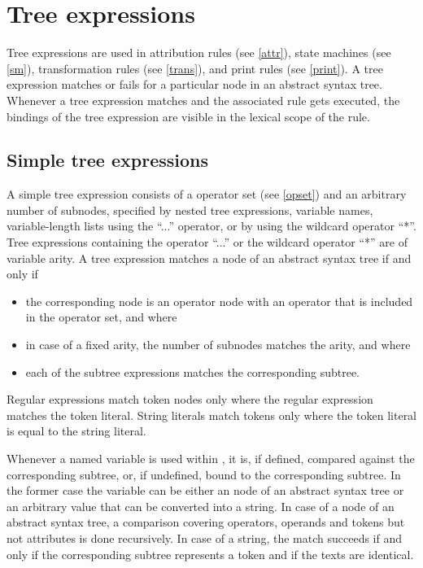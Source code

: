 \chapter{Tree expressions}\label{treeexpr}

Tree expressions are used in attribution rules (see \ref{attr}), state
machines (see \ref{sm}), transformation rules (see \ref{trans}), and
print rules (see \ref{print}). A tree expression matches or fails for a
particular node in an abstract syntax tree. Whenever a tree expression
matches and the associated rule gets executed, the bindings of the tree
expression are visible in the lexical scope of the rule.

\section{Simple tree expressions}

A simple tree expression consists of a operator set (see \ref{opset}) and an arbitrary number of subnodes, specified
by nested tree expressions, variable names, variable-length lists
using the ``...'' operator, or by using the wildcard operator
``*''. Tree expressions containing the operator ``...'' or the wildcard
operator ``*'' are of variable arity.  A tree
expression matches a node of an abstract syntax tree if and only if
\begin{itemize}
   \item the corresponding node is an operator node
      with an operator that is included in the operator set, and where
   \item in case of a fixed arity, the number of subnodes matches
      the arity, and where
   \item each of the subtree expressions matches the corresponding subtree.
\end{itemize}

Regular expressions match token nodes only
where the regular expression matches the token literal. String literals
match tokens only where the token literal is equal to the string literal.

Whenever a named variable is used within , it
is, if defined, compared against the corresponding subtree, or, if
undefined, bound to the corresponding subtree. In the former case the
variable can be either an node of an abstract syntax tree or an arbitrary value
that can be converted into a string. In case of a node of an abstract
syntax tree, a comparison covering operators, operands and tokens but
not attributes is done recursively. In case of a string, the match
succeeds if and only if the corresponding subtree represents a token
and if the texts are identical.

